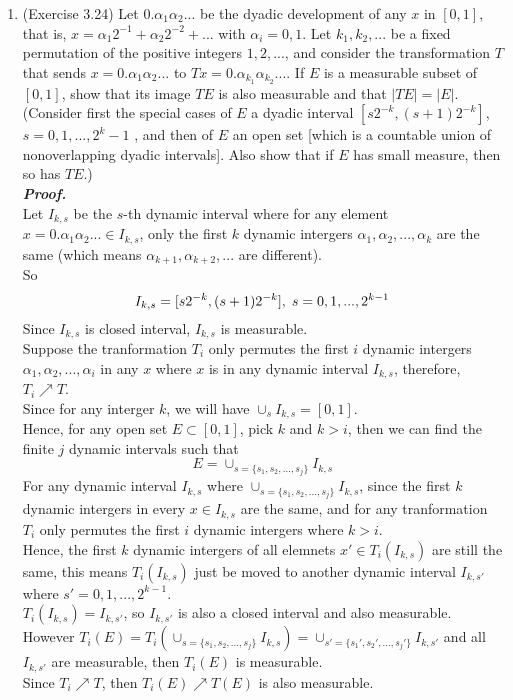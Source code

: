 \documentclass[a4paper,11pt]{article}
\begin{document}
\begin{enumerate}
\item (Exercise 3.24) Let $0.\alpha_1 \alpha_2 ...$ be the dyadic development of any $x$ in $[0, 1]$, that is, $x = \alpha_1 2^{-1} + \alpha_2 2^{-2} + ...$ with $\alpha_i = 0, 1$. Let $k_1, k_2, ...$ be a fixed permutation of the positive integers $1, 2, ... $, and consider the transformation $T$ that sends $x = 0.\alpha_1 \alpha_2 ...$ to $Tx = 0.\alpha_{k_1} \alpha_{k_2} ...$. If $E$ is a measurable subset of $[0, 1]$, show that its image $TE$ is also measurable and that $|TE| = |E|$. (Consider first the special cases of $E$ a dyadic interval $[s2^{-k}, (s+1)2^{-k}]$, $s = 0,1,...,2^k - 1$ , and then of $E$ an open set [which is a countable union of nonoverlapping dyadic intervals]. Also show that if $E$ has small measure, then so has $TE$.)\\
\newline
\textit{\textbf {Proof.}}\\
Let $I_{k,s}$ be the $s$-th dynamic interval where for any element $x = 0.\alpha_1 \alpha_2 ... \in I_{k,s}$, only the first $k$ dynamic intergers $\alpha_1, \alpha_2, ..., \alpha_k$ are the same (which means $\alpha_{k+1}, \alpha_{k+2}, ...$ are different).\\
So
$$I_{k,s} = [s2^{-k}, (s+1)2^{-k}], \hspace{0.1cm} s = 0,1,...,2^{k-1}$$
Since $I_{k,s}$ is closed interval, $I_{k,s}$ is measurable.\\
Suppose the tranformation $T_i$ only permutes the first $i$ dynamic intergers $\alpha_1, \alpha_2, ..., \alpha_i$ in any $x$ where $x$ is in any dynamic interval $I_{k,s}$, therefore, $T_i \nearrow T$.\\
Since for any interger $k$, we will have $\cup_s I_{k,s} = [0,1]$.\\
Hence, for any open set $E \subset [0,1]$, pick $k$ and $k > i$, then we can find the finite $j$ dynamic intervals such that
$$E = \cup_{s = \{s_1, s_2, ..., s_j\}} I_{k,s}$$
For any dynamic interval $I_{k,s}$ where $\cup_{s = \{s_1, s_2, ..., s_j\}} I_{k,s}$, since the first $k$ dynamic intergers in every $x \in I_{k,s}$ are the same, and for any tranformation $T_i$ only permutes the first $i$ dynamic intergers where $k > i$.\\
Hence, the first $k$ dynamic intergers of all elemnets $x' \in T_i(I_{k,s})$ are still the same, this means $T_i(I_{k,s})$ just be moved to another dynamic interval $I_{k, s'}$ where $s' = 0,1,...,2^{k-1}$.\\
$T_i(I_{k,s}) = I_{k, s'}$, so $I_{k,s'}$ is also a closed interval and also measurable.\\
However $T_i(E) = T_i(\cup_{s = \{s_1, s_2, ..., s_j\}} I_{k,s}) = \cup_{s' = \{s_1', s_2', ..., s_j'\}} I_{k,s'}$ and all $I_{k,s'}$ are measurable, then $T_i (E)$ is measurable.\\
Since $T_i \nearrow T$, then $T_i(E) \nearrow T(E)$ is also measurable.\\\\


\end{enumerate}
\end{document}
